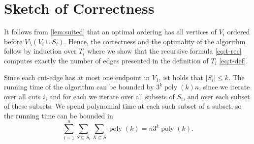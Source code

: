\documentclass[a4paper,UKenglish,cleveref, autoref, thm-restate]{lipics-v2021}
\begin{document}
\section{Sketch of Correctness}
It follows from \cref{lem:suited} that an optimal ordering has all vertices of $V_i$ ordered before $V\setminus (V_i \cup S_i)$.
Hence, the correctness and the optimality of the algorithm follow by induction over $T_i$ where we show that the recursive formula \cref{eq:t-rec} computes exactly the number of edges presented in the definition of $T_i$ \cref{eq:t-def}.

Since each cut-edge has at most one endpoint in $V_1$, ist holds that $|S_i|\leq k$.
The running time of the algorithm can be bounded by $3^k \operatorname{poly}(k)n$, since we iterate over all cuts $i$, and for each we iterate over all subsets of $S_i$, and over each subset of these subsets. We spend polynomial time at each such subset of a subset, so the running time can be bounded in 
\[
\sum_{i=1}^{n}\sum\limits_{S\subseteq S_i}\sum\limits_{X\subseteq S} \operatorname{poly}(k) = n3^k\operatorname{poly}(k).
\]

\end{document}

